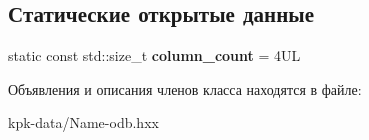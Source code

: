 \subsection*{Статические открытые данные}
\begin{DoxyCompactItemize}
\item 
static const std\+::size\+\_\+t {\bfseries column\+\_\+count} = 4\+UL\hypertarget{classodb_1_1access_1_1composite__value__traits_3_01_1_1kpk_1_1data_1_1_name_00_01id__pgsql_01_4_aad5380b47e62c1979d8c8efb350056fa}{}\label{classodb_1_1access_1_1composite__value__traits_3_01_1_1kpk_1_1data_1_1_name_00_01id__pgsql_01_4_aad5380b47e62c1979d8c8efb350056fa}

\end{DoxyCompactItemize}


Объявления и описания членов класса находятся в файле\+:\begin{DoxyCompactItemize}
\item 
kpk-\/data/Name-\/odb.\+hxx\end{DoxyCompactItemize}
